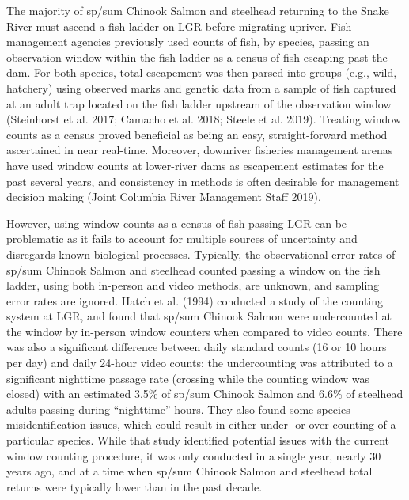 \documentclass[
  12pt,
]{article}
\begin{document}
The majority of sp/sum Chinook Salmon and steelhead returning to the Snake River must ascend a fish ladder on LGR before migrating upriver. Fish management agencies previously used counts of fish, by species, passing an observation window within the fish ladder as a census of fish escaping past the dam. For both species, total escapement was then parsed into groups (e.g., wild, hatchery) using observed marks and genetic data from a sample of fish captured at an adult trap located on the fish ladder upstream of the observation window (Steinhorst et al. 2017; Camacho et al. 2018; Steele et al. 2019). Treating window counts as a census proved beneficial as being an easy, straight-forward method ascertained in near real-time. Moreover, downriver fisheries management arenas have used window counts at lower-river dams as escapement estimates for the past several years, and consistency in methods is often desirable for management decision making (Joint Columbia River Management Staff 2019).

However, using window counts as a census of fish passing LGR can be problematic as it fails to account for multiple sources of uncertainty and disregards known biological processes. Typically, the observational error rates of sp/sum Chinook Salmon and steelhead counted passing a window on the fish ladder, using both in-person and video methods, are unknown, and sampling error rates are ignored. Hatch et al. (1994) conducted a study of the counting system at LGR, and found that sp/sum Chinook Salmon were undercounted at the window by in-person window counters when compared to video counts. There was also a significant difference between daily standard counts (16 or 10 hours per day) and daily 24-hour video counts; the undercounting was attributed to a significant nighttime passage rate (crossing while the counting window was closed) with an estimated 3.5\% of sp/sum Chinook Salmon and 6.6\% of steelhead adults passing during ``nighttime'' hours. They also found some species misidentification issues, which could result in either under- or over-counting of a particular species. While that study identified potential issues with the current window counting procedure, it was only conducted in a single year, nearly 30 years ago, and at a time when sp/sum Chinook Salmon and steelhead total returns were typically lower than in the past decade.
\end{document}
